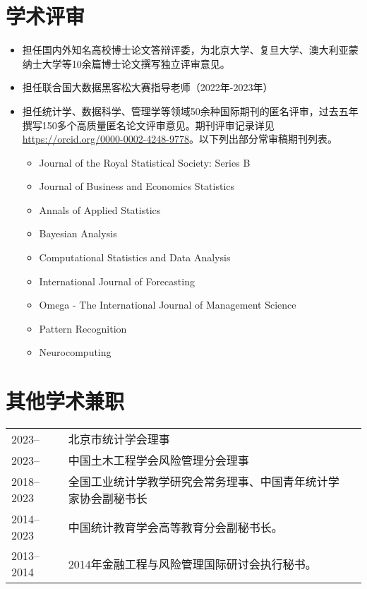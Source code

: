 \documentclass[twoside,a4paper,11pt]{article}
\begin{document}
\section{学术评审}

\begin{itemize}
\item   担任国内外知名高校博士论文答辩评委，为北京大学、复旦大学、澳大利亚蒙纳士大学等10余篇博士论文撰写独立评审意见。
\item   担任联合国大数据黑客松大赛指导老师（2022年-2023年）
\item   担任统计学、数据科学、管理学等领域50余种国际期刊的匿名评审，过去五年撰写150多个高质量匿名论文评审意见。期刊评审记录详见 \url{https://orcid.org/0000-0002-4248-9778}。以下列出部分常审稿期刊列表。
\begin{itemize}
\item Journal of the Royal Statistical Society: Series B
\item Journal of Business and Economics Statistics
\item Annals of Applied Statistics
\item Bayesian Analysis
\item Computational Statistics and Data Analysis
\item International Journal of Forecasting
\item Omega - The International Journal of Management Science
\item Pattern Recognition
\item Neurocomputing
\end{itemize}
\end{itemize}

\section{其他学术兼职}
\begin{tabular}{l p{} l}
  2023--     & 北京市统计学会理事                                             \\
  2023--     & 中国土木工程学会风险管理分会理事                               \\
  2018--2023 & 全国工业统计学教学研究会常务理事、中国青年统计学家协会副秘书长 \\
  2014--2023 & 中国统计教育学会高等教育分会副秘书长。                         \\
  2013--2014 & 2014年金融工程与风险管理国际研讨会执行秘书。                   \\
\end{tabular}
\end{document}
